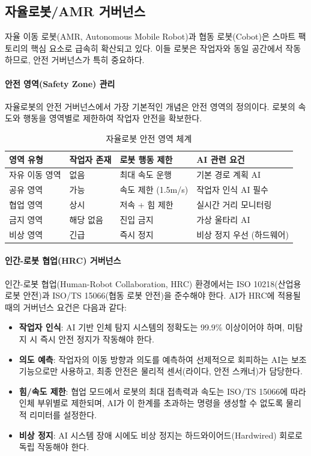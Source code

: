 \subsection{자율로봇/AMR 거버넌스}
\label{sec:19.3.3}

자율 이동 로봇(AMR, Autonomous Mobile Robot)과 협동 로봇(Cobot)은 스마트 팩토리의 핵심 요소로 급속히 확산되고 있다. 이들 로봇은 작업자와 동일 공간에서 작동하므로, 안전 거버넌스가 특히 중요하다.

\paragraph{안전 영역(Safety Zone) 관리}

자율로봇의 안전 거버넌스에서 가장 기본적인 개념은 안전 영역의 정의이다. 로봇의 속도와 행동을 영역별로 제한하여 작업자 안전을 확보한다.

\begin{table}[htbp]
\centering
\caption{자율로봇 안전 영역 체계}
\label{tab:19_safety_zones}
\begin{tabularx}{\textwidth}{p{2.5cm}p{2cm}Xp{3.5cm}}
\toprule
\textbf{영역 유형} & \textbf{작업자 존재} & \textbf{로봇 행동 제한} & \textbf{AI 관련 요건} \\
\midrule
자유 이동 영역 & 없음 & 최대 속도 운행 & 기본 경로 계획 AI \\
공유 영역 & 가능 & 속도 제한 (1.5m/s) & 작업자 인식 AI 필수 \\
협업 영역 & 상시 & 저속 + 힘 제한 & 실시간 거리 모니터링 \\
금지 영역 & 해당 없음 & 진입 금지 & 가상 울타리 AI \\
비상 영역 & 긴급 & 즉시 정지 & 비상 정지 우선 (하드웨어) \\
\bottomrule
\end{tabularx}
\end{table}

\paragraph{인간-로봇 협업(HRC) 거버넌스}

인간-로봇 협업(Human-Robot Collaboration, HRC) 환경에서는 ISO 10218(산업용 로봇 안전)과 ISO/TS 15066(협동 로봇 안전)을 준수해야 한다. AI가 HRC에 적용될 때의 거버넌스 요건은 다음과 같다:

\begin{itemize}
    \item \textbf{작업자 인식}: AI 기반 인체 탐지 시스템의 정확도는 99.9\% 이상이어야 하며, 미탐지 시 즉시 안전 정지가 작동해야 한다.
    \item \textbf{의도 예측}: 작업자의 이동 방향과 의도를 예측하여 선제적으로 회피하는 AI는 보조 기능으로만 사용하고, 최종 안전은 물리적 센서(라이다, 안전 스캐너)가 담당한다.
    \item \textbf{힘/속도 제한}: 협업 모드에서 로봇의 최대 접촉력과 속도는 ISO/TS 15066에 따라 인체 부위별로 제한되며, AI가 이 한계를 초과하는 명령을 생성할 수 없도록 물리적 리미터를 설정한다.
    \item \textbf{비상 정지}: AI 시스템 장애 시에도 비상 정지는 하드와이어드(Hardwired) 회로로 독립 작동해야 한다.
\end{itemize}

